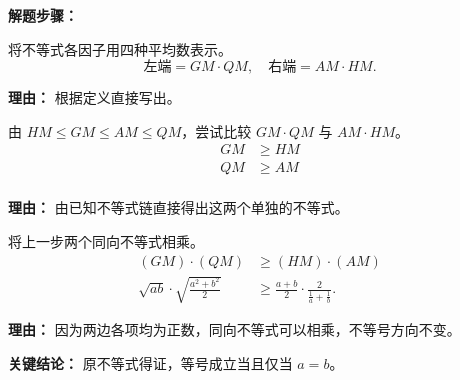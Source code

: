 \begin{examplebox}
\textbf{\textcolor{CExample}{解题步骤：}}
\begin{description}[style=nextline, leftmargin=2.8em, labelsep=0.5em, itemsep=0.45em]
    \item[\textbf{第一步（识别平均数）：}] 将不等式各因子用四种平均数表示。
    \[
    \text{左端} = GM \cdot QM, \quad \text{右端} = AM \cdot HM.
    \]
    \par\textbf{理由：} 根据定义直接写出。
    \item[\textbf{第二步（应用不等式链）：}] 由 $HM \le GM \le AM \le QM$，尝试比较 $GM \cdot QM$ 与 $AM \cdot HM$。
    \[
    \begin{aligned}
    GM &\ge HM \\
    QM &\ge AM \\
    \end{aligned}
    \]
    \par\textbf{理由：} 由已知不等式链直接得出这两个单独的不等式。
    \item[\textbf{第三步（相乘并判断方向）：}] 将上一步两个同向不等式相乘。
    \[
    \begin{aligned}
    (GM) \cdot (QM) &\ge (HM) \cdot (AM) \\
    \sqrt{ab} \cdot \sqrt{\frac{a^2+b^2}{2}} &\ge \frac{a+b}{2} \cdot \frac{2}{\frac{1}{a}+\frac{1}{b}}.
    \end{aligned}
    \]
    \par\textbf{理由：} 因为两边各项均为正数，同向不等式可以相乘，不等号方向不变。
\end{description}

\textbf{\textcolor{CExample}{关键结论：}} 原不等式得证，等号成立当且仅当 $a=b$。
\end{examplebox}
